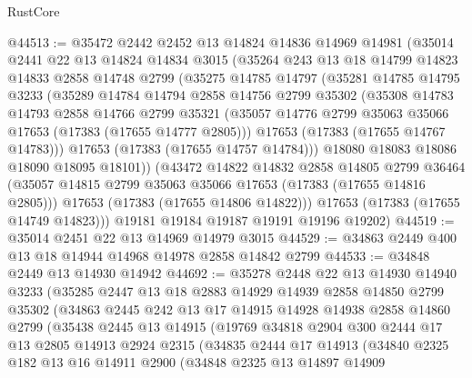 \begin{lexlean}{RustCore}
\begin{coremodule}
@44513 := @35472
    @2442
    @2452
    @13
    @14824
    @14836
    @14969
    @14981
    (@35014
      @2441
      @22
      @13
      @14824
      @14834
      @3015
      (@35264
        @243
        @13
        @18
        @14799
        @14823
        @14833
        @2858
        @14748
        @2799
        (@35275
          @14785
          @14797
          (@35281
            @14785
            @14795
            @3233
            (@35289
              @14784
              @14794
              @2858
              @14756
              @2799
              @35302
              (@35308
                @14783
                @14793
                @2858
                @14766
                @2799
                @35321
                (@35057 @14776 @2799 @35063 @35066 @17653 (@17383 (@17655 @14777 @2805)))
                @17653
                (@17383 (@17655 @14767 @14783)))
              @17653
              (@17383 (@17655 @14757 @14784)))
            @18080
            @18083
            @18086
            @18090
            @18095
            @18101))
        (@43472
          @14822
          @14832
          @2858
          @14805
          @2799
          @36464
          (@35057 @14815 @2799 @35063 @35066 @17653 (@17383 (@17655 @14816 @2805)))
          @17653
          (@17383 (@17655 @14806 @14822)))
        @17653
        (@17383 (@17655 @14749 @14823)))
      @19181
      @19184
      @19187
      @19191
      @19196
      @19202)
@44519 := @35014 @2451 @22 @13 @14969 @14979 @3015
@44529 := @34863 @2449 @400 @13 @18 @14944 @14968 @14978 @2858 @14842 @2799
@44533 := @34848 @2449 @13 @14930 @14942
@44692 := @35278
    @2448
    @22
    @13
    @14930
    @14940
    @3233
    (@35285
      @2447
      @13
      @18
      @2883
      @14929
      @14939
      @2858
      @14850
      @2799
      @35302
      (@34863
        @2445
        @242
        @13
        @17
        @14915
        @14928
        @14938
        @2858
        @14860
        @2799
        (@35438
          @2445
          @13
          @14915
          (@19769
            @34818
            @2904
            @300
            @2444
            @17
            @13
            @2805
            @14913
            @2924
            @2315
            (@34835
              @2444
              @17
              @14913
              (@34840
                @2325
                @182
                @13
                @16
                @14911
                @2900
                (@34848
                  @2325
                  @13
                  @14897
                  @14909

\end{coremodule}
\end{lexlean}
